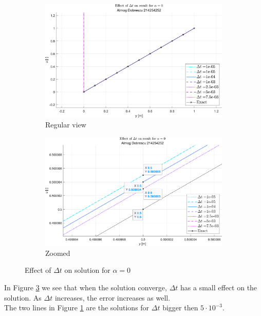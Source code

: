 \documentclass[11pt, a4paper]{article}
\begin{document}
\begin{figure}[H]
    \centering
    \begin{subfigure}[b]{.49\textwidth}
        \centering
        \includegraphics[width=\textwidth]{images/grap2.1.png}
        \caption{Regular view}
        \label{fig2A}
    \end{subfigure}
    \hfill
    \begin{subfigure}[b]{.49\textwidth}
        \centering
        \includegraphics[width=\textwidth]{images/grap2.2.png}
        \caption{Zoomed}
        \label{fig2B}
    \end{subfigure}
    \caption{Effect of $\Delta t$ on solution for $\alpha =0$}
    \label{fig2}
\end{figure}
\noindent In Figure \ref{fig2} we see that when the solution converge, $\Delta t$ has a small effect on the solution. As $\Delta t$ increases, the error increases as well.\\
\noindent The two lines in Figure \ref{fig2A} are the solutions for $\Delta t$ bigger then $5\cdot10^{-3}.$
\end{document}
